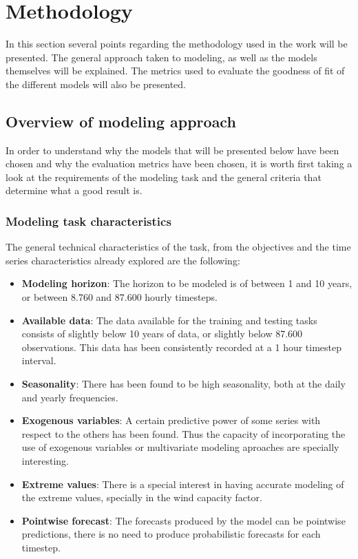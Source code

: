 \section{Methodology}
In this section several points regarding the methodology used in the work will be presented. The general approach taken to modeling, as well as the models themselves will be explained. The metrics used to evaluate the goodness of fit of the different models will also be presented. 

\subsection{Overview of modeling approach}
In order to understand why the models that will be presented below have been chosen and why the evaluation metrics have been chosen, it is worth first taking a look at the requirements of the modeling task and the general criteria that determine what a good result is.

\subsubsection{Modeling task characteristics}
\label{s:modeling-task-characteristics}
The general technical characteristics of the task, from the objectives and the time series characteristics already explored are the following:
\begin{itemize}
    \item \textbf{Modeling horizon}: The horizon to be modeled is of between 1 and 10 years, or between 8.760 and 87.600 hourly timesteps. 
    \item \textbf{Available data}: The data available for the training and testing tasks consists of slightly below 10 years of data, or slightly below 87.600 observations. This data has been consistently recorded at a 1 hour timestep interval.
    \item \textbf{Seasonality}: There has been found to be high seasonality, both at the daily and yearly frequencies. 
    \item \textbf{Exogenous variables}: A certain predictive power of some series with respect to the others has been found. Thus the capacity of incorporating the use of exogenous variables or multivariate modeling aproaches are specially interesting. 
    \item \textbf{Extreme values}: There is a special interest in having accurate modeling of the extreme values, specially in the wind capacity factor.
    \item \textbf{Pointwise forecast}: The forecasts produced by the model can be pointwise predictions, there is no need to produce probabilistic forecasts for each timestep.
\end{itemize}


